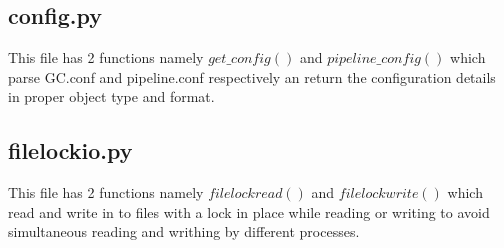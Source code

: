 \subsection{config.py}
This file has 2 functions namely $get\_config()$ and $pipeline\_config()$ which
parse GC.conf and pipeline.conf respectively an return the configuration
details in proper object type and format.


\subsection{filelockio.py}
This file has 2 functions namely $filelockread()$ and $filelockwrite()$ which read
and write in to files with a lock in place while reading or writing to avoid
simultaneous reading and writhing by different processes.


